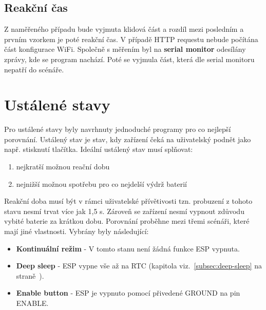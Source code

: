 \documentclass[a4paper, 12pt]{report}
\begin{document}
    \subsection{Reakční čas}
    \label{subsec:wifi-reakce}
    Z naměřeného případu bude vyjmuta klidová část a rozdíl mezi posledním a prvním vzorkem je poté reakční čas. V případě HTTP requestu nebude počítána část konfigurace WiFi. Společně s měřením byl na \textbf{serial monitor} odesílány zprávy, kde se program nachází. Poté se vyjmula část, která dle serial monitoru nepatří do scénáře.


    \section{Ustálené stavy}
    Pro ustálené stavy byly navrhnuty jednoduché programy pro co nejlepší porovnání. Ustálený stav je stav, kdy zařízení čeká na uživatelský podnět jako např. stisknutí tlačítka. Ideální ustálený stav musí splňovat:
    \begin{enumerate}
        \item nejkratší možnou reační dobu
        \item nejnižší možnou spotřebu pro co nejdelší výdrž baterií
    \end{enumerate}
    Reakční doba musí být v rámci uživatelské přívětivosti tzn. probuzení z tohoto stavu nesmí trvat více jak 1,5 \si{s}. Zároveň se zařízení nesmí vypnout zdůvodu vybité baterie za krátkou dobu. Porovnání proběhne mezi třemi scénáři, které mají jiné vlastnosti. Vybrány byly následující:
    \begin{itemize}
        \item \textbf{Kontinuální režim} - V tomto stanu není žádná funkce ESP vypnuta.
        \item \textbf{Deep sleep} - ESP vypne vše až na RTC (kapitola viz.~\ref{subsec:deep-sleep} na straně~\pageref{subsec:deep-sleep}).
        \item \textbf{Enable button} - ESP je vypnuto pomocí přivedené GROUND na pin ENABLE\@.
    \end{itemize}
\end{document}
